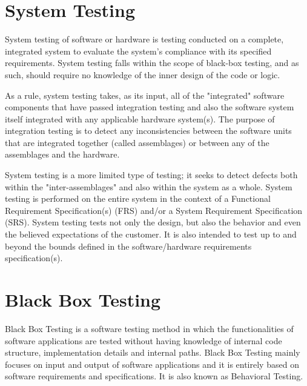 \documentclass[12pt, a4paper]{report}
\begin{document}
\section{System Testing}
System testing of software or hardware is testing conducted on a complete, integrated system to
evaluate the system's compliance with its specified requirements. System testing falls within the
scope of black-box testing, and as such, should require no knowledge of the inner design of the code
or logic. \par As a rule, system testing takes, as its input, all of the "integrated" software components that have passed integration testing and also the software system itself integrated with any applicable
hardware system(s). The purpose of integration testing is to detect any inconsistencies between the
software units that are integrated together (called assemblages) or between any of
the assemblages and the hardware. \par System testing is a more limited type of testing; it seeks to detect
defects both within the "inter-assemblages" and also within the system as a whole.
System testing is performed on the entire system in the context of a Functional
Requirement Specification(s) (FRS) and/or a System Requirement Specification (SRS). System
testing tests not only the design, but also the behavior and even the believed expectations of the
customer. It is also intended to test up to and beyond the bounds defined in the software/hardware
requirements specification(s).

\newpage
\section{Black Box Testing}

Black Box Testing is a software testing method in which the functionalities of software applications are tested without having knowledge of internal code structure, implementation details and internal paths. Black Box Testing mainly focuses on input and output of software applications and it is entirely based on software requirements and specifications. It is also known as Behavioral Testing.
\end{document}
